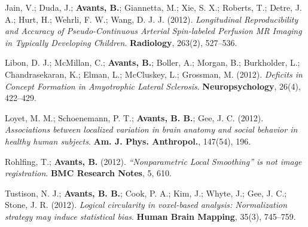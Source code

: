 \documentclass[10pt,letterpaper]{article}
\begin{document}
\begin{enumerate}
{  \item Jain, V.; Duda, J.; \textbf{Avants, B.}; Giannetta, M.; Xie, S. X.; Roberts, T.; Detre, J. A.; Hurt, H.; Wehrli, F. W.; Wang, D. J. J. (2012). \textit{Longitudinal Reproducibility and Accuracy of Pseudo-Continuous Arterial Spin-labeled Perfusion MR Imaging in Typically Developing Children}. \textbf{Radiology}, 263(2), 527--536.
  \item Libon, D. J.; McMillan, C.; \textbf{Avants, B.}; Boller, A.; Morgan, B.; Burkholder, L.; Chandrasekaran, K.; Elman, L.; McCluskey, L.; Grossman, M. (2012). \textit{Deficits in Concept Formation in Amyotrophic Lateral Sclerosis}. \textbf{Neuropsychology}, 26(4), 422--429.
  \item Loyet, M. M.; Schoenemann, P. T.; \textbf{Avants, B. B.}; Gee, J. C. (2012). \textit{Associations between localized variation in brain anatomy and social behavior in healthy human subjects}. \textbf{Am. J. Phys. Anthropol.}, 147(54), 196.
  \item Rohlfing, T.; \textbf{Avants, B.} (2012). \textit{``Nonparametric Local Smoothing'' is not image registration}. \textbf{BMC Research Notes}, 5, 610.
  \item Tustison, N. J.; \textbf{Avants, B. B.}; Cook, P. A.; Kim, J.; Whyte, J.; Gee, J. C.; Stone, J. R. (2012). \textit{Logical circularity in voxel-based analysis: Normalization strategy may induce statistical bias}. \textbf{Human Brain Mapping}, 35(3), 745--759.

}
\end{enumerate}
\end{document}
